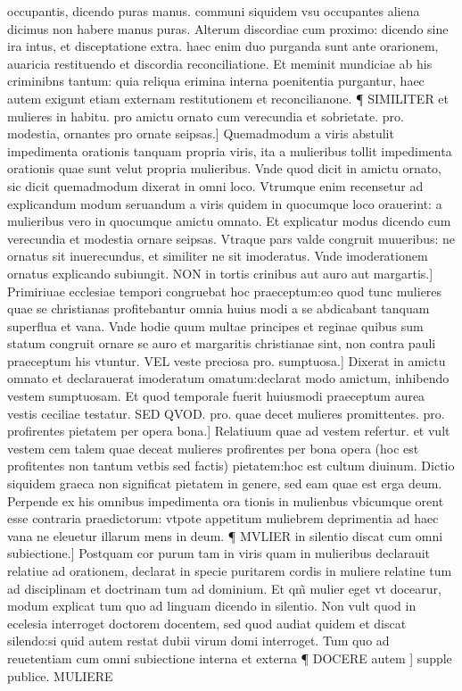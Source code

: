 \documentclass{article}
\begin{document}
\begin{pages}
occupantis, dicendo puras manus. communi siquidem vsu occupantes aliena dicimus non habere manus puras. Alterum discordiae cum proximo: dicendo sine ira  intus, et disceptatione extra. haec enim duo purganda sunt ante orarionem, auaricia restituendo et discordia reconciliatione. Et meminit mundiciae ab his criminibns tantum: quia reliqua erimina interna poenitentia purgantur, haec autem exigunt etiam externam restitutionem et reconcilianone. ¶ SIMILITER et mulieres in habitu. pro amictu  ornato cum verecundia et sobrietate. pro. modestia, ornantes pro ornate  seipsas.] Quemadmodum a viris abstulit impedimenta orationis tanquam propria viris, ita a mulieribus tollit impedimenta orationis quae sunt velut propria mulieribus. Vnde quod dicit in amictu ornato, sic dicit quemadmodum dixerat in omni loco. Vtrumque  enim recensetur ad explicandum modum seruandum  a viris quidem in quocumque  loco orauerint: a mulieribus vero in quocumque  amictu omnato. Et explicatur modus dicendo cum verecundia et modestia ornare seipsas. Vtraque  pars valde congruit muueribus: ne ornatus sit inuerecundus, et similiter ne sit imoderatus. Vnde imoderationem ornatus explicando subiungit. NON in tortis crinibus aut auro aut margartis.] Primiriuae ecclesiae tempori congruebat hoc praeceptum:eo quod tunc mulieres quae se christianas profitebantur  omnia huius modi a se abdicabant tanquam superflua et vana. Vnde hodie quum multae principes et reginae quibus sum statum congruit ornare se auro et margaritis  christianae sint, non contra pauli praeceptum his vtuntur. VEL veste preciosa pro. sumptuosa.] Dixerat in amictu omnato  et declarauerat imoderatum omatum:declarat modo amictum, inhibendo vestem sumptuosam. Et quod temporale fuerit huiusmodi praeceptum  aurea vestis ceciliae testatur. SED QVOD. pro. quae  decet mulieres promittentes. pro. profirentes  pietatem per opera bona.] Relatiuum quae ad vestem refertur. et vult vestem cem talem quae deceat mulieres profirentes per bona opera (hoc est profitentes non tantum vetbis sed factis) pietatem:hoc est cultum diuinum. Dictio siquidem graeca non significat pietatem in genere, sed eam quae est erga deum. Perpende ex his omnibus impedimenta ora tionis in mulienbus vbicumque  orent esse contraria praedictorum: vtpote appetitum muliebrem deprimentia ad haec vana ne eleuetur illarum mens in deum. ¶ MVLIER in silentio discat cum omni subiectione.] Postquam cor purum tam in viris quam in mulieribus declarauit relatiue ad orationem, declarat in specie puritarem cordis in muliere relatine tum ad disciplinam et doctrinam  tum ad dominium. Et qm̃ mulier eget vt docearur, modum explicat tum quo ad linguam  dicendo in silentio. Non vult quod in ecelesia interroget doctorem docentem, sed quod audiat quidem et discat silendo:si quid autem restat dubii  virum domi interroget. Tum quo ad reuetentiam cum omni subiectione  interna et externa ¶ DOCERE autem ] supple publice. MULIERE  \pend

\end{pages}
\end{document}
